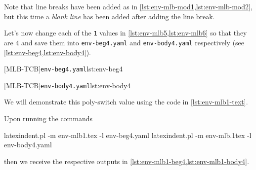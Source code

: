 		\begin{widepage}
			\begin{minipage}{.56\linewidth}
			\end{minipage}
			\hfill
			\begin{minipage}{.43\linewidth}
			\end{minipage}
		\end{widepage}

		Note that line breaks have been added as in \cref{lst:env-mlb-mod1,lst:env-mlb-mod2}, but
		this time a \emph{blank line} has been added after adding the line break.

		Let's now change  each
		of the \texttt{1} values in \cref{lst:env-mlb5,lst:env-mlb6} so that they are $4$ and
		save them into \texttt{env-beg4.yaml} and \texttt{env-body4.yaml} respectively (see
		\cref{lst:env-beg4,lst:env-body4}). %

		\begin{minipage}{.45\textwidth}
			{\texttt{env-beg4.yaml}}{lst:env-beg4}
		\end{minipage}
		\hfill
		\begin{minipage}{.45\textwidth}
			{\texttt{env-body4.yaml}}{lst:env-body4}
		\end{minipage}

		We will demonstrate this poly-switch value using the code in \cref{lst:env-mlb1-text}.


		Upon running the commands  
		\begin{commandshell}
latexindent.pl -m env-mlb1.tex -l env-beg4.yaml
latexindent.pl -m env-mlb.1tex -l env-body4.yaml
\end{commandshell}

		then we receive the respective outputs in \cref{lst:env-mlb1-beg4,lst:env-mlb1-body4}.

